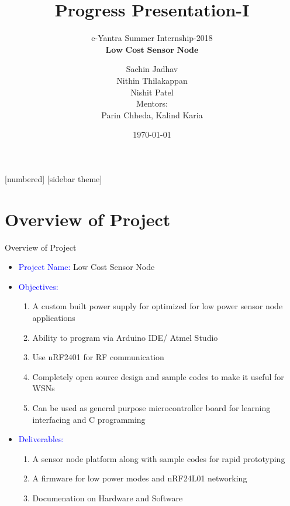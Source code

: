 \documentclass[10pt, a4paper]{beamer}
\begin{document}
	\title{Progress Presentation-I}
	\subtitle{e-Yantra Summer Internship-2018 \\ $ \textbf{Low Cost Sensor Node} $}
	\author{Sachin Jadhav\\Nithin Thilakappan\\Nishit Patel\\ \vspace{1em}
	Mentors:\\ Parin Chheda, Kalind Karia}
	\date{\today}
	\frame{\titlepage}

[numbered]
[sidebar theme]
\section{Overview of Project}
\begin{frame}{Overview of Project}
	\begin{itemize}
		\item \textcolor{blue}{Project Name:} Low Cost Sensor Node
		\item \textcolor{blue}{Objectives:}
        	\begin{enumerate}
        		\item A custom built power supply for optimized for low power sensor node applications
				\item Ability to program via Arduino IDE/ Atmel Studio
				\item Use nRF2401 for RF communication
				\item Completely open source design and sample codes to make it useful for WSNs
				\item Can be used as general purpose microcontroller board for learning interfacing and C
programming
                \end{enumerate}
		\item \textcolor{blue}{Deliverables:}
        \begin{enumerate}
        		\item A sensor node platform along with sample codes for rapid prototyping
				\item A firmware for low power modes and nRF24L01 networking
				\item Documenation on Hardware and Software
			
                \end{enumerate} 
	\end{itemize}
\end{frame}
\end{document}
